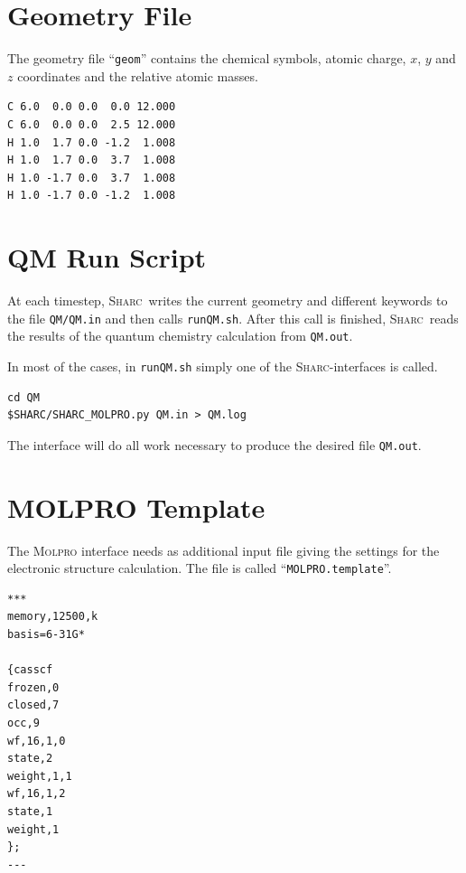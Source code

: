\documentclass[a4paper,11pt,DIV=15,openany]{scrbook}
\newcommand{\sharc}{\textsc{Sharc}}
\newcommand{\ttt}[1]{\texttt{#1}}
\begin{document}
\section{Geometry File}

The geometry file ``\ttt{geom}'' contains the chemical symbols, atomic charge, $x$, $y$ and $z$ coordinates and the relative atomic masses.

\begin{shaded}\vspace{-8mm}
\begin{verbatim}
C 6.0  0.0 0.0  0.0 12.000
C 6.0  0.0 0.0  2.5 12.000
H 1.0  1.7 0.0 -1.2  1.008
H 1.0  1.7 0.0  3.7  1.008
H 1.0 -1.7 0.0  3.7  1.008
H 1.0 -1.7 0.0 -1.2  1.008
\end{verbatim}\vspace{-5mm}
\end{shaded}

\section{QM Run Script}

At each timestep, \sharc\ writes the current geometry and different keywords to the file \ttt{QM/QM.in} and then calls \ttt{runQM.sh}. After this call is finished, \sharc\ reads the results of the quantum chemistry calculation from \ttt{QM.out}.

In most of the cases, in \ttt{runQM.sh} simply one of the \sharc-interfaces is called.
\begin{shaded}\vspace{-8mm}
\begin{verbatim}
cd QM
$SHARC/SHARC_MOLPRO.py QM.in > QM.log
\end{verbatim}\vspace{-5mm}
\end{shaded}
The interface will do all work necessary to produce the desired file \ttt{QM.out}.

\section{MOLPRO Template}

The \textsc{Molpro} interface needs as additional input file giving the settings for the electronic structure calculation. The file is called ``\ttt{MOLPRO.template}''.

\begin{shaded}\vspace{-8mm}
\begin{verbatim}
***
memory,12500,k
basis=6-31G*

{casscf
frozen,0
closed,7
occ,9
wf,16,1,0
state,2
weight,1,1
wf,16,1,2
state,1
weight,1
};
---
\end{verbatim}\vspace{-5mm}
\end{shaded}
\end{document}
